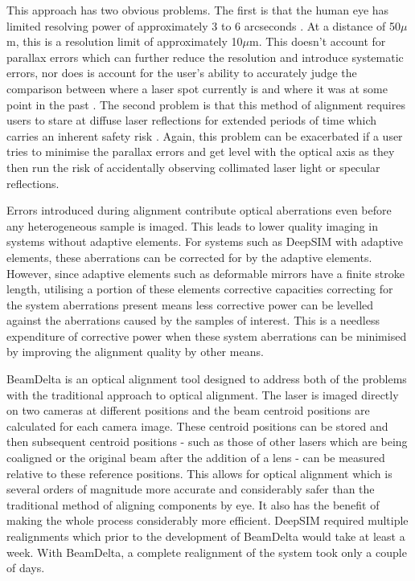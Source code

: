 This approach has two obvious problems. The first is that the
human eye has limited resolving power of approximately 3 to 6
arcseconds \cite{ogle1951resolving}. At a distance of 50$\mu$m,
this is a resolution limit of approximately 10$\mu$m. This doesn't account for parallax errors which
can further reduce the resolution and introduce systematic
errors, nor does is account for the user's ability to
accurately judge the comparison between where a laser spot
currently is and where it was at some point in the past
\cite{mardanbegi2012parallax}. The second problem is that this
method of alignment requires users to stare at diffuse laser
reflections for extended periods of time which carries an
inherent safety risk \cite{sliney1995laser}. Again, this
problem can be exacerbated if a user tries to minimise the
parallax errors and get level with the optical axis as they
then run the risk of accidentally observing collimated laser
light or specular reflections. 

Errors introduced during alignment contribute optical aberrations even before any heterogeneous sample is imaged. This leads to lower quality imaging in systems without adaptive elements. For systems such as DeepSIM with adaptive elements, these aberrations can be corrected for by the adaptive elements. However, since adaptive elements such as deformable mirrors have a finite stroke length, utilising a portion of these elements corrective capacities correcting for the system aberrations present means less corrective power can be levelled against the aberrations caused by the samples of interest. This is a needless expenditure of corrective power when these system aberrations can be minimised by  improving the alignment quality by other means.

BeamDelta is an optical alignment tool designed to address both of the problems with the traditional approach to optical alignment. The laser is imaged directly on two cameras at different positions and the beam centroid positions are calculated for each camera image. These centroid positions can be stored and then subsequent centroid positions - such as those of other lasers which are being coaligned or the original beam after the addition of a lens - can be measured relative to these reference positions. This allows for optical alignment which is several orders of magnitude more accurate and considerably safer than the traditional method of aligning components by eye\cite{dobbie2019beamdelta}. It also has the benefit of making the whole process considerably more efficient. DeepSIM required multiple realignments which prior to the development of BeamDelta would take at least a week. With BeamDelta, a complete realignment of the system took only a couple of days.

